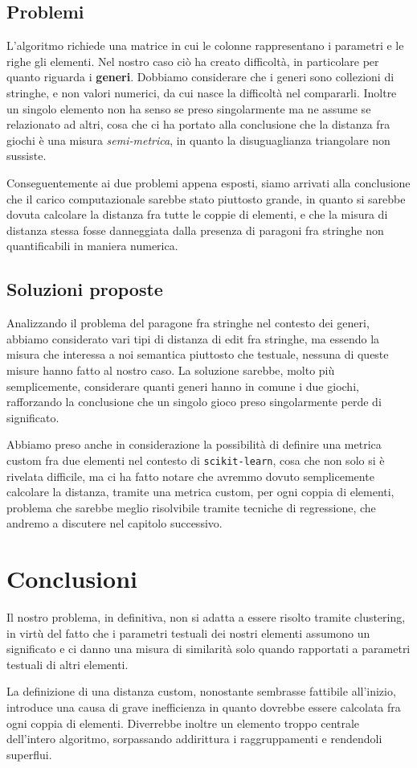     \subsection{Problemi}
        L'algoritmo richiede una matrice in cui le colonne rappresentano i parametri e le righe gli elementi. Nel nostro caso ciò ha creato difficoltà, in particolare per quanto riguarda i \textbf{generi}. Dobbiamo considerare che i generi sono collezioni di stringhe, e non valori numerici, da cui nasce la difficoltà nel compararli. Inoltre un singolo elemento non ha senso se preso singolarmente ma ne assume se relazionato ad altri, cosa che ci ha portato alla conclusione che la distanza fra giochi è una misura \textit{semi-metrica}, in quanto la disuguaglianza triangolare non sussiste.
        
        Conseguentemente ai due problemi appena esposti, siamo arrivati alla conclusione che il carico computazionale sarebbe stato piuttosto grande, in quanto si sarebbe dovuta calcolare la distanza fra tutte le coppie di elementi, e che la misura di distanza stessa fosse danneggiata dalla presenza di paragoni fra stringhe non quantificabili in maniera numerica.
        
    \subsection{Soluzioni proposte}
        Analizzando il problema del paragone fra stringhe nel contesto dei generi, abbiamo considerato vari tipi di distanza di edit fra stringhe, ma essendo la misura che interessa a noi semantica piuttosto che testuale, nessuna di queste misure hanno fatto al nostro caso. La soluzione sarebbe, molto più semplicemente, considerare quanti generi hanno in comune i due giochi, rafforzando la conclusione che un singolo gioco preso singolarmente perde di significato.
        
        Abbiamo preso anche in considerazione la possibilità di definire una metrica custom fra due elementi nel contesto di \texttt{scikit-learn}, cosa che non solo si è rivelata difficile, ma ci ha fatto notare che avremmo dovuto semplicemente calcolare la distanza, tramite una metrica custom, per ogni coppia di elementi, problema che sarebbe meglio risolvibile tramite tecniche di regressione, che andremo a discutere nel capitolo successivo.
    
\section{Conclusioni}
    Il nostro problema, in definitiva, non si adatta a essere risolto tramite clustering, in virtù del fatto che i parametri testuali dei nostri elementi assumono un significato e ci danno una misura di similarità solo quando rapportati a parametri testuali di altri elementi.
    
    La definizione di una distanza custom, nonostante sembrasse fattibile all'inizio, introduce una causa di grave inefficienza in quanto dovrebbe essere calcolata fra ogni coppia di elementi. Diverrebbe inoltre un elemento troppo centrale dell'intero algoritmo, sorpassando addirittura i raggruppamenti e rendendoli superflui.